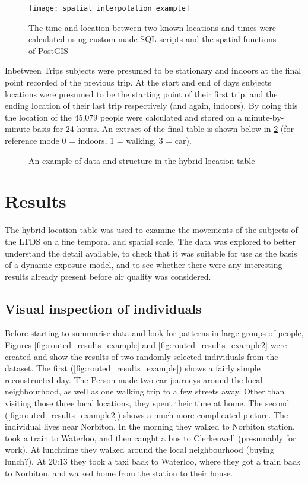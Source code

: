 \begin{figure}[H]
\centering
\texttt{[image: spatial\_interpolation\_example]}
\caption{The time and location between two known locations and times were calculated using custom-made SQL scripts and the spatial functions of PostGIS}
\label{fig:spatial_interpolation_example}
\end{figure}

Inbetween Trips subjects were presumed to be stationary and indoors at the final point recorded of the previous trip. At the start and end of days subjects locations were presumed to be the starting point of their first trip, and the ending location of their last trip respectively (and again, indoors). By doing this the location of the 45,079 people were calculated and stored on a minute-by-minute basis for 24 hours. An extract of the final table is shown below in \ref{fig:hybrid_location_table} (for reference mode 0 = indoors, 1 = walking, 3 = car).

\begin{figure}[H]
\centering
{}
\caption{An example of data and structure in the hybrid location table}
\label{fig:hybrid_location_table}
\end{figure}

\section{Results}
\label{sec:reconstruction_results}

The hybrid location table was used to examine the movements of the subjects of the LTDS on a fine temporal and spatial scale. The data was explored to better understand the detail available, to check that it was suitable for use as the basis of a dynamic exposure model, and to see whether there were any interesting results already present before air quality was considered.

\subsection{Visual inspection of individuals}
\label{sec:visual_inspection_of_individuals}

Before starting to summarise data and look for patterns in large groups of people, Figures \ref{fig:routed_results_example} and \ref{fig:routed_results_example2} were created and show the results of two randomly selected individuals from the dataset. The first (\ref{fig:routed_results_example}) shows a fairly simple reconstructed day. The Person made two car journeys around the local neighbourhood, as well as one walking trip to a few streets away. Other than visiting those three local locations, they spent their time at home. The second (\ref{fig:routed_results_example2}) shows a much more complicated picture. The individual lives near Norbiton. In the morning they walked to Norbiton station, took a train to Waterloo, and then caught a bus to Clerkenwell (presumably for work). At lunchtime they walked around the local neighbourhood (buying lunch?). At 20:13 they took a taxi back to Waterloo, where they got a train back to Norbiton, and walked home from the station to their house.


